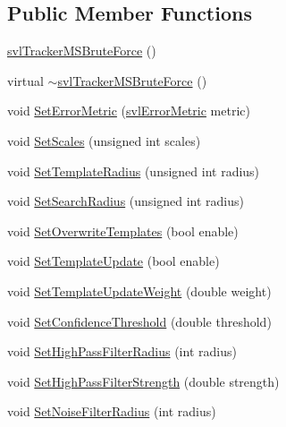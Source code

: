 \subsection*{Public Member Functions}
\begin{DoxyCompactItemize}
\item 
\hyperlink{classsvl_tracker_m_s_brute_force_a2470055d3d8f5305e48787ae0f7f240c}{svl\-Tracker\-M\-S\-Brute\-Force} ()
\item 
virtual \hyperlink{classsvl_tracker_m_s_brute_force_ab5c4229254e7ab14eea08ac78220e7b4}{$\sim$svl\-Tracker\-M\-S\-Brute\-Force} ()
\item 
void \hyperlink{classsvl_tracker_m_s_brute_force_abb9c51f0b86abe7948cf4dfd3702a3a1}{Set\-Error\-Metric} (\hyperlink{svl_definitions_8h_ade0b97ec3319ac710d7478dd2b608727}{svl\-Error\-Metric} metric)
\item 
void \hyperlink{classsvl_tracker_m_s_brute_force_af9182e93e36b2406a66c1a7fd486d0f8}{Set\-Scales} (unsigned int scales)
\item 
void \hyperlink{classsvl_tracker_m_s_brute_force_af0bfe7c826026da77bbf6033cad7dc19}{Set\-Template\-Radius} (unsigned int radius)
\item 
void \hyperlink{classsvl_tracker_m_s_brute_force_a00ec03b33c779ad68b31ab2528a2e114}{Set\-Search\-Radius} (unsigned int radius)
\item 
void \hyperlink{classsvl_tracker_m_s_brute_force_a3579db61626498f401f4c620937aac43}{Set\-Overwrite\-Templates} (bool enable)
\item 
void \hyperlink{classsvl_tracker_m_s_brute_force_a6f7a4d1445ea58692efd9c483f590c73}{Set\-Template\-Update} (bool enable)
\item 
void \hyperlink{classsvl_tracker_m_s_brute_force_a59d97d48ddaadb46fd803c66efa04b94}{Set\-Template\-Update\-Weight} (double weight)
\item 
void \hyperlink{classsvl_tracker_m_s_brute_force_a9a4157dd77a9e19190ba70997b50d42f}{Set\-Confidence\-Threshold} (double threshold)
\item 
void \hyperlink{classsvl_tracker_m_s_brute_force_ad1f1dce8e2d10248263443cd3aed27fd}{Set\-High\-Pass\-Filter\-Radius} (int radius)
\item 
void \hyperlink{classsvl_tracker_m_s_brute_force_af81e46cb9a8eefd5359a58420933365c}{Set\-High\-Pass\-Filter\-Strength} (double strength)
\item 
void \hyperlink{classsvl_tracker_m_s_brute_force_a8cdef27e154cd0a3ecd55f7abf5b7df8}{Set\-Noise\-Filter\-Radius} (int radius)
\item 

\end{DoxyCompactItemize}
